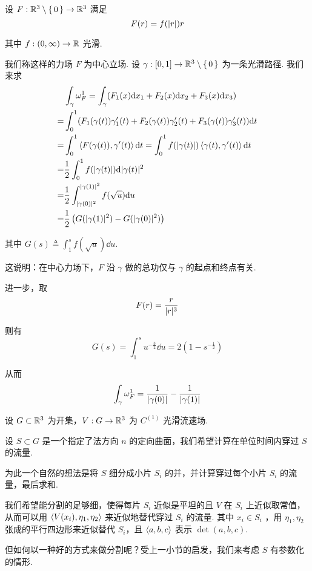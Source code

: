 \begin{example}
    设 $F:\mathbb{R}^3\setminus\set{0}\to\mathbb{R}^3$ 满足
$$
F(r)=f(\lvert{r}\rvert)r
$$

    其中 $f:(0,\infty)\to\mathbb{R}$ 光滑.

    我们称这样的力场 $F$ 为中心立场. 设 $\gamma:[0,1]\to\mathbb{R}^3\setminus\set{0}$ 为一条光滑路径. 我们来求
$$
\begin{aligned}
    &\int_\gamma\omega_F^1=\int_\gamma(F_1(x)\mathrm{d} x_1+F_2(x)\mathrm{d} x_2+F_3(x)\mathrm{d} x_3)\\
    =&\int_0^1(F_1(\gamma(t))\gamma_1'(t)+F_2(\gamma(t))\gamma_2'(t)+F_3(\gamma(t))\gamma_3'(t))\mathrm{d} t\\
    =&\int_0^1\left\langle{F(\gamma(t)),\gamma'(t)}\right\rangle\mathrm{d} t=\int_0^1f(\lvert{\gamma(t)}\rvert)\left\langle{\gamma(t),\gamma'(t)}\right\rangle\mathrm{d} t\\
    =&\frac{1}{2}\int_0^1f(\lvert{\gamma(t)}\rvert)\mathrm{d}\lvert{\gamma(t)}\rvert^2\\
    =&\frac{1}{2}\int_{\lvert{\gamma(0)}\rvert^2}^{\lvert{\gamma(1)}\rvert^2}f(\sqrt{u})\mathrm{d} u\\
    =&\frac{1}{2}\left(G(\lvert{\gamma(1)}\rvert^2)-G(\lvert{\gamma(0)}\rvert^2)\right)
\end{aligned}
$$

    其中 $G(s)\triangleq\int_1^sf(\sqrt{u})\dd u$.

    这说明：在中心力场下，$F$ 沿 $\gamma$ 做的总功仅与 $\gamma$ 的起点和终点有关.
    
    进一步，取
$$
F(r)=\frac{r}{\lvert{r}\rvert^3}
$$

    则有
$$
G(s)=\int_1^su^{-\frac{3}{2}}\dd u=2\left(1-s^{-\frac{1}{2}}\right)
$$

    从而
$$
\int_\gamma\omega_F^1=\frac{1}{\lvert{\gamma(0)}\rvert}-\frac{1}{\lvert{\gamma(1)}\rvert}
$$
\end{example}


设 $G\subset\mathbb{R}^3$ 为开集，$V:G\to\mathbb{R}^3$ 为 $C^{(1)}$ 光滑流速场.

设 $S\subset G$ 是一个指定了法方向 $n$ 的定向曲面，我们希望计算在单位时间内穿过 $S$ 的流量.

为此一个自然的想法是将 $S$ 细分成小片 $S_i$ 的并，并计算穿过每个小片 $S_i$ 的流量，最后求和.

我们希望能分割的足够细，使得每片 $S_i$ 近似是平坦的且 $V$ 在 $S_i$ 上近似取常值，从而可以用 $\left\langle{V(x_i),\eta_1,\eta_2}\right\rangle$ 来近似地替代穿过 $S_i$ 的流量. 其中 $x_i\in S_i$ ，用 $\eta_1,\eta_2$ 张成的平行四边形来近似替代 $S_i$，且 $\left\langle{a,b,c}\right\rangle$ 表示 $\det(a,b,c)$.

但如何以一种好的方式来做分割呢？受上一小节的启发，我们来考虑 $S$ 有参数化的情形.

